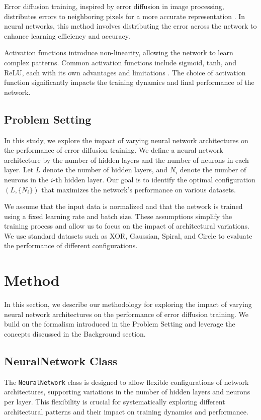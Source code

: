 \documentclass{article} %
\begin{document}
Error diffusion training, inspired by error diffusion in image processing, distributes errors to neighboring pixels for a more accurate representation \citep{journ2023hebbian}. In neural networks, this method involves distributing the error across the network to enhance learning efficiency and accuracy.

Activation functions introduce non-linearity, allowing the network to learn complex patterns. Common activation functions include sigmoid, tanh, and ReLU, each with its own advantages and limitations \citep{goodfellow2016deep}. The choice of activation function significantly impacts the training dynamics and final performance of the network.

\subsection{Problem Setting}
\label{sec:problem_setting}

In this study, we explore the impact of varying neural network architectures on the performance of error diffusion training. We define a neural network architecture by the number of hidden layers and the number of neurons in each layer. Let $L$ denote the number of hidden layers, and $N_i$ denote the number of neurons in the $i$-th hidden layer. Our goal is to identify the optimal configuration $(L, \{N_i\})$ that maximizes the network's performance on various datasets.

We assume that the input data is normalized and that the network is trained using a fixed learning rate and batch size. These assumptions simplify the training process and allow us to focus on the impact of architectural variations. We use standard datasets such as XOR, Gaussian, Spiral, and Circle to evaluate the performance of different configurations.

\section{Method}
\label{sec:method}

In this section, we describe our methodology for exploring the impact of varying neural network architectures on the performance of error diffusion training. We build on the formalism introduced in the Problem Setting and leverage the concepts discussed in the Background section.

\subsection{NeuralNetwork Class}
The \texttt{NeuralNetwork} class is designed to allow flexible configurations of network architectures, supporting variations in the number of hidden layers and neurons per layer. This flexibility is crucial for systematically exploring different architectural patterns and their impact on training dynamics and performance.
\end{document}
